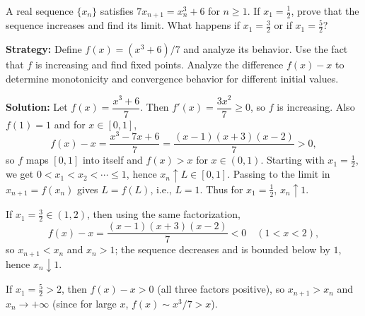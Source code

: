 \begin{problembox}
\begin{problemstatement}
A real sequence $\{x_n\}$ satisfies $7x_{n+1} = x_n^3 + 6$ for $n \geq 1$. If $x_1 = \frac{1}{2}$, prove that the sequence increases and find its limit. What happens if $x_1 = \frac{3}{2}$ or if $x_1 = \frac{5}{2}$?
\end{problemstatement}
\end{problembox}

\noindent\textbf{Strategy:} Define $f(x) = (x^3 + 6)/7$ and analyze its behavior. Use the fact that $f$ is increasing and find fixed points. Analyze the difference $f(x) - x$ to determine monotonicity and convergence behavior for different initial values.

\bigskip\noindent\textbf{Solution:}
Let $f(x)=\dfrac{x^3+6}{7}$. Then $f'(x)=\dfrac{3x^2}{7}\ge 0$, so $f$ is increasing. Also $f(1)=1$ and for $x\in[0,1]$,
\[
f(x)-x=\frac{x^3-7x+6}{7}=\frac{(x-1)(x+3)(x-2)}{7}>0,
\]
so $f$ maps $[0,1]$ into itself and $f(x)>x$ for $x\in(0,1)$. Starting with $x_1=\tfrac12$, we get $0<x_1<x_2<\cdots\le 1$, hence $x_n\uparrow L\in[0,1]$. Passing to the limit in $x_{n+1}=f(x_n)$ gives $L=f(L)$, i.e., $L=\textbf{$1$}$. Thus for $x_1=\tfrac12$, $x_n\uparrow \textbf{$1$}$.

If $x_1=\tfrac32\in(1,2)$, then using the same factorization,
\[
f(x)-x=\frac{(x-1)(x+3)(x-2)}{7}<0\quad(1<x<2),
\]
so $x_{n+1}<x_n$ and $x_n>1$; the sequence decreases and is bounded below by $1$, hence $x_n\downarrow \textbf{$1$}$.

If $x_1=\tfrac52>2$, then $f(x)-x>0$ (all three factors positive), so $x_{n+1}>x_n$ and $x_n\to+\infty$ (since for large $x$, $f(x)\sim x^3/7>x$).

